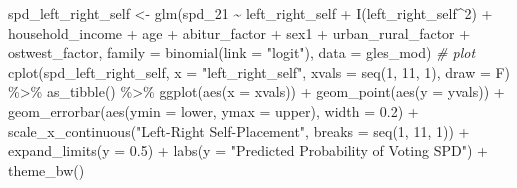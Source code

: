 \documentclass[
]{article}
\newenvironment{Shaded}{\begin{snugshade}}{\end{snugshade}}
\newcommand{\AttributeTok}[1]{\textcolor[rgb]{0.77,0.63,0.00}{#1}}
\newcommand{\CommentTok}[1]{\textcolor[rgb]{0.56,0.35,0.01}{\textit{#1}}}
\newcommand{\DecValTok}[1]{\textcolor[rgb]{0.00,0.00,0.81}{#1}}
\newcommand{\FloatTok}[1]{\textcolor[rgb]{0.00,0.00,0.81}{#1}}
\newcommand{\FunctionTok}[1]{\textcolor[rgb]{0.00,0.00,0.00}{#1}}
\newcommand{\NormalTok}[1]{#1}
\newcommand{\OtherTok}[1]{\textcolor[rgb]{0.56,0.35,0.01}{#1}}
\newcommand{\SpecialCharTok}[1]{\textcolor[rgb]{0.00,0.00,0.00}{#1}}
\newcommand{\StringTok}[1]{\textcolor[rgb]{0.31,0.60,0.02}{#1}}
\begin{document}
\begin{Shaded}
\begin{Highlighting}[]
\NormalTok{spd\_left\_right\_self }\OtherTok{\textless{}{-}} \FunctionTok{glm}\NormalTok{(spd\_21 }\SpecialCharTok{\textasciitilde{}}\NormalTok{ left\_right\_self }\SpecialCharTok{+} \FunctionTok{I}\NormalTok{(left\_right\_self}\SpecialCharTok{\^{}}\DecValTok{2}\NormalTok{) }\SpecialCharTok{+}\NormalTok{ household\_income }\SpecialCharTok{+}\NormalTok{ age }\SpecialCharTok{+}\NormalTok{ abitur\_factor }\SpecialCharTok{+}\NormalTok{ sex1 }\SpecialCharTok{+}\NormalTok{ urban\_rural\_factor }\SpecialCharTok{+}\NormalTok{ ostwest\_factor, }\AttributeTok{family =} \FunctionTok{binomial}\NormalTok{(}\AttributeTok{link =} \StringTok{"logit"}\NormalTok{), }\AttributeTok{data =}\NormalTok{ gles\_mod)}
\CommentTok{\# plot }
\FunctionTok{cplot}\NormalTok{(spd\_left\_right\_self, }\AttributeTok{x =} \StringTok{"left\_right\_self"}\NormalTok{, }
      \AttributeTok{xvals =} \FunctionTok{seq}\NormalTok{(}\DecValTok{1}\NormalTok{, }\DecValTok{11}\NormalTok{, }\DecValTok{1}\NormalTok{), }\AttributeTok{draw =}\NormalTok{ F) }\SpecialCharTok{\%\textgreater{}\%}
  \FunctionTok{as\_tibble}\NormalTok{() }\SpecialCharTok{\%\textgreater{}\%}
  \FunctionTok{ggplot}\NormalTok{(}\FunctionTok{aes}\NormalTok{(}\AttributeTok{x =}\NormalTok{ xvals)) }\SpecialCharTok{+}
  \FunctionTok{geom\_point}\NormalTok{(}\FunctionTok{aes}\NormalTok{(}\AttributeTok{y =}\NormalTok{ yvals)) }\SpecialCharTok{+}
  \FunctionTok{geom\_errorbar}\NormalTok{(}\FunctionTok{aes}\NormalTok{(}\AttributeTok{ymin =}\NormalTok{ lower, }\AttributeTok{ymax =}\NormalTok{ upper), }\AttributeTok{width =} \FloatTok{0.2}\NormalTok{) }\SpecialCharTok{+}
  \FunctionTok{scale\_x\_continuous}\NormalTok{(}\StringTok{"Left{-}Right Self{-}Placement"}\NormalTok{, }
                     \AttributeTok{breaks =} \FunctionTok{seq}\NormalTok{(}\DecValTok{1}\NormalTok{, }\DecValTok{11}\NormalTok{, }\DecValTok{1}\NormalTok{)) }\SpecialCharTok{+}
  \FunctionTok{expand\_limits}\NormalTok{(}\AttributeTok{y =} \FloatTok{0.5}\NormalTok{) }\SpecialCharTok{+}
  \FunctionTok{labs}\NormalTok{(}\AttributeTok{y =} \StringTok{"Predicted Probability of Voting SPD"}\NormalTok{) }\SpecialCharTok{+}
  \FunctionTok{theme\_bw}\NormalTok{()}
\end{Highlighting}
\end{Shaded}
\end{document}
